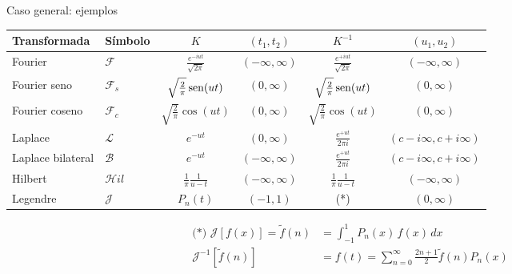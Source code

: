 \documentclass[9pt, aspectratio=169]{beamer}
\begin{document}
\begin{frame}{Caso general: ejemplos}

	\begin{center}
		\begin{tabular}{llcccc}
			\toprule
			\textbf{Transformada} & \textbf{Símbolo} & $K$                             & $(t_1, t_2)$        & $K^{-1}$                        & $(u_1, u_2)$             \\
			\midrule
			Fourier               & $\mathscr{F}$    & $\frac{e^{-iut}}{\sqrt{2 \pi}}$ & $(-\infty, \infty)$ & $\frac{e^{+iut}}{\sqrt{2 \pi}}$ & $(-\infty, \infty)$      \\
			Fourier seno          & $\mathscr{F}_s$  & $\sqrt{\frac{2}{\pi}} \operatorname{sen}(ut)$ & $(0, \infty)$       & $\sqrt{\frac{2}{\pi}} \operatorname{sen}(ut)$ & $(0, \infty)$            \\
			Fourier coseno        & $\mathscr{F}_c$  & $\sqrt{\frac{2}{\pi}} \cos(ut)$ & $(0, \infty)$       & $\sqrt{\frac{2}{\pi}} \cos(ut)$ & $(0, \infty)$            \\
			Laplace               & $\mathscr{L}$    & $e^{-ut}$                       & $(0, \infty)$       & $\frac{e^{+ut}}{2 \pi i}$       & $(c-i\infty, c+i\infty)$ \\
			Laplace bilateral     & $\mathscr{B}$    & $e^{-ut}$                       & $(-\infty, \infty)$ & $\frac{e^{+ut}}{2 \pi i}$       & $(c-i\infty, c+i\infty)$ \\
			Hilbert               & $\mathcal{H}il$  & $\frac{1}{\pi} \frac{1}{u-t}$   & $(-\infty, \infty)$ & $\frac{1}{\pi} \frac{1}{u-t}$   & $(-\infty, \infty)$      \\
			Legendre              & $\mathcal{J}$    & $P_n(t)$                        & $(-1, 1)$           & (*)                             & $(0, \infty)$            \\
			\bottomrule
		\end{tabular}
	\end{center}
	\begin{align*}
		\text{(*) }\mathcal{J}[f(x)] = \tilde{f}(n) & = \int_{-1}^{1} P_n(x) \, f(x) \, dx                                 \\
		\mathcal{J}^{-1}[\tilde{f}(n)]              & = f(t) = \sum_{n = 0}^{\infty} \frac{2 n + 1}{2} \tilde{f}(n) P_n(x)
	\end{align*}
\end{frame}
\end{document}
